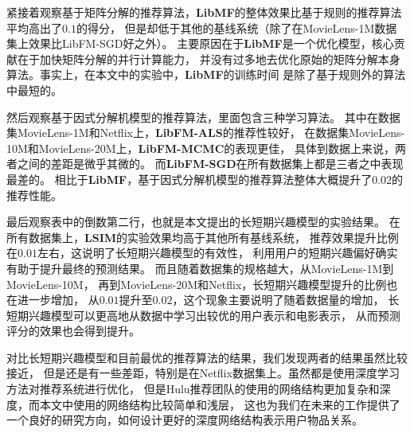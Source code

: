 紧接着观察基于矩阵分解的推荐算法，\textbf{LibMF}的整体效果比基于规则的推荐算法平均高出了$0.1$的得分，
但是却低于其他的基线系统（除了在MovieLens-1M数据集上效果比LibFM-SGD好之外）。
主要原因在于\textbf{LibMF}是一个优化模型，核心贡献在于加快矩阵分解的并行计算能力，
并没有过多地去优化原始的矩阵分解本身算法。事实上，在本文中的实验中，\textbf{LibMF}的训练时间
是除了基于规则外的算法中最短的。

然后观察基于因式分解机模型的推荐算法，里面包含三种学习算法。
其中在数据集MovieLens-1M和Netflix上，\textbf{LibFM-ALS}的推荐性较好，
在数据集MovieLens-10M和MovieLens-20M上，\textbf{LibFM-MCMC}的表现更佳，
具体到数据上来说，两者之间的差距是微乎其微的。
而\textbf{LibFM-SGD}在所有数据集上都是三者之中表现最差的。
相比于\textbf{LibMF}，基于因式分解机模型的推荐算法整体大概提升了$0.02$的推荐性能。

最后观察表中的倒数第二行，也就是本文提出的长短期兴趣模型的实验结果。
在所有数据集上，\textbf{LSIM}的实验效果均高于其他所有基线系统，
推荐效果提升比例在$0.01$左右，这说明了长短期兴趣模型的有效性，
利用用户的短期兴趣偏好确实有助于提升最终的预测结果。
而且随着数据集的规格越大，从MovieLens-1M到MovieLens-10M，
再到MovieLens-20M和Netflix，长短期兴趣模型提升的比例也在进一步增加，
从$0.01$提升至$0.02$，这个现象主要说明了随着数据量的增加，
长短期兴趣模型可以更高地从数据中学习出较优的用户表示和电影表示，
从而预测评分的效果也会得到提升。

对比长短期兴趣模型和目前最优的推荐算法的结果，我们发现两者的结果虽然比较接近，
但是还是有一些差距，特别是在Netflix数据集上。虽然都是使用深度学习方法对推荐系统进行优化，
但是Hulu推荐团队的使用的网络结构更加复杂和深度，而本文中使用的网络结构比较简单和浅层，
这也为我们在未来的工作提供了一个良好的研究方向，如何设计更好的深度网络结构表示用户物品关系。


